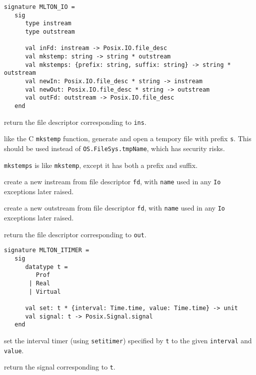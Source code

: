 
\begin{verbatim}
signature MLTON_IO =
   sig
      type instream
      type outstream

      val inFd: instream -> Posix.IO.file_desc
      val mkstemp: string -> string * outstream
      val mkstemps: {prefix: string, suffix: string} -> string * outstream
      val newIn: Posix.IO.file_desc * string -> instream
      val newOut: Posix.IO.file_desc * string -> outstream
      val outFd: outstream -> Posix.IO.file_desc
   end
\end{verbatim}

\begin{description}

 return the file descriptor corresponding to {\tt ins}.

like the C {\tt mkstemp} function, generate and open a tempory file with prefix
{\tt s}.  This should be used instead of {\tt OS.FileSys.tmpName}, which has
security risks.

{\tt mkstemps} is like {\tt mkstemp}, except it has both a prefix and suffix.

 create a new instream from file descriptor
{\tt fd}, with {\tt name} used in any {\tt Io} exceptions later
raised.

 create a new outstream from file descriptor
{\tt  fd}, with {\tt name} used in any {\tt Io} exceptions later
raised.

 return the file descriptor corresponding to
{\tt out}.
\end{description}


\begin{verbatim}
signature MLTON_ITIMER =
   sig
      datatype t =
         Prof
       | Real
       | Virtual

      val set: t * {interval: Time.time, value: Time.time} -> unit
      val signal: t -> Posix.Signal.signal
   end
\end{verbatim}

\begin{description}
set the interval timer (using {\tt setitimer}) specified by {\tt t} to
the given {\tt interval} and {\tt value}.

return the signal corresponding to {\tt t}.
\end{description}
%
